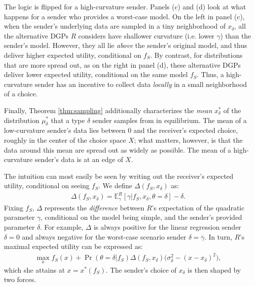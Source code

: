 \documentclass[11pt,dvipsnames]{article}
\begin{document}
The logic is flipped for a high-curvature sender.
Panels (c) and (d) look at what happens for a sender who provides a worst-case model.
On the left in panel (c), when the sender's underlying data are sampled in a tiny neighborhood of $x_\delta$, all the alternative DGPs $R$ considers have shallower curvature (i.e. lower $\gamma$) than the sender's model.
However, they all lie \emph{above} the sender's original model, and thus deliver higher expected utility, conditional on $f_S$.
By contrast, for distributions that are more spread out, as on the right in panel (d), these alternative DGPs deliver lower expected utility, conditional on the same model $f_S$.
Thus, a high-curvature sender has an incentive to collect data \emph{locally} in a small neighborhood of a choice.

Finally, Theorem \ref{thm:sampling} additionally characterizes the \emph{mean} $x_\delta^*$ of the distribution $\mu_\delta^*$ that a type $\delta$ sender samples from in equilibrium.
The mean of a low-curvature sender's data lies between $0$ and the receiver's expected choice, roughly in the center of the choice space $X$; what matters, however, is that the data around this mean are spread out as widely as possible.
The mean of a high-curvature sender's data is at an edge of $X$.

The intuition can most easily be seen by writing out the receiver's expected utility, conditional on seeing $f_S$.
We define $\Delta(f_S,x_\delta)$ as:
\begin{align*}
\Delta(f_S,x_\delta) = \mathbb{E}_\gamma^R[\gamma|f_S,x_\delta,\theta=\delta]-\delta.
\end{align*}
Fixing $f_S$, $\Delta$ represents the \emph{difference} between $R$'s expectation of the quadratic parameter $\gamma$, conditional on the model being simple, and the sender's provided parameter $\delta$.
For example, $\Delta$ is always positive for the linear regression sender $\delta = 0$ and always negative for the worst-case scenario sender $\delta = \overline{\gamma}$.
In turn, $R$'s maximal expected utility can be expressed as:
\begin{align*}
\max_x f_S(x)+\Pr(\theta=\delta|f_S)\Delta(f_S,x_\delta)\big(\sigma_\delta^2-(x-x_\delta)^2\big),
\end{align*}
which she attains at $x=x^*(f_S)$.
The sender's choice of $x_\delta$ is then shaped by two forces.
\end{document}
